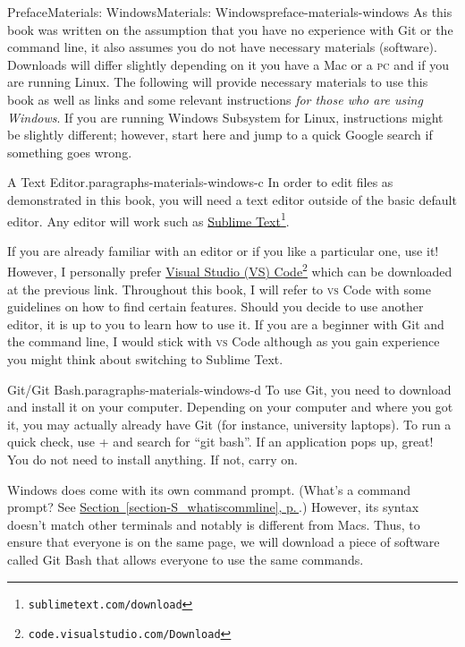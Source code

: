 \documentclass[twoside,10pt,]{book}
\newcommand{\xreffont}{\relax}
\newcommand{\initialism}[1]{\textsc{\MakeLowercase{#1}}}
\newcommand{\kbd}[1]{\keys{{#1}}}
\begin{document}
\begin{preface}{Preface}{Materials: Windows}{}{Materials: Windows}{}{}{preface-materials-windows}
As this book was written on the assumption that you have no experience with Git or the command line, it also assumes you do not have necessary materials (software). Downloads will differ slightly depending on it you have a Mac or a \initialism{PC} and if you are running Linux. The following will provide necessary materials to use this book as well as links and some relevant instructions \emph{for those who are using Windows}. If you are running Windows Subsystem for Linux, instructions might be slightly different; however, start here and jump to a quick Google search if something goes wrong.%
\begin{paragraphs}{A Text Editor.}{paragraphs-materials-windows-c}%
In order to edit files as demonstrated in this book, you will need a text editor outside of the basic default editor. Any editor will work such as \href{https://www.sublimetext.com/download}{Sublime Text}\footnote{\nolinkurl{sublimetext.com/download}\label{fn-materials-windows-c-b-b}}.%
\par
If you are already familiar with an editor or if you like a particular one, use it! However, I personally prefer \href{https://code.visualstudio.com/Download}{Visual Studio (VS) Code}\footnote{\nolinkurl{code.visualstudio.com/Download}\label{fn-materials-windows-c-c-b}} which can be downloaded at the previous link. Throughout this book, I will refer to \initialism{VS} Code with some guidelines on how to find certain features. Should you decide to use another editor, it is up to you to learn how to use it. If you are a beginner with Git and the command line, I would stick with \initialism{VS} Code although as you gain experience you might think about switching to Sublime Text.%
\end{paragraphs}%
\begin{paragraphs}{Git\slash{}Git Bash.}{paragraphs-materials-windows-d}%
To use Git, you need to download and install it on your computer. Depending on your computer and where you got it, you may actually already have Git (for instance, university laptops). To run a quick check, use \kbd{Windows} + \kbd{S} and search for ``git bash''. If an application pops up, great! You do not need to install anything. If not, carry on.%
\par
Windows does come with its own command prompt. (What's a command prompt? See \hyperref[section-S_whatiscommline]{Section~{\xreffont\ref{section-S_whatiscommline}}, p.\,\pageref{section-S_whatiscommline}}.) However, its syntax doesn't match other terminals and notably is different from Macs. Thus, to ensure that everyone is on the same page, we will download a piece of software called Git Bash that allows everyone to use the same commands.%

\end{paragraphs}
\end{preface}
\end{document}
